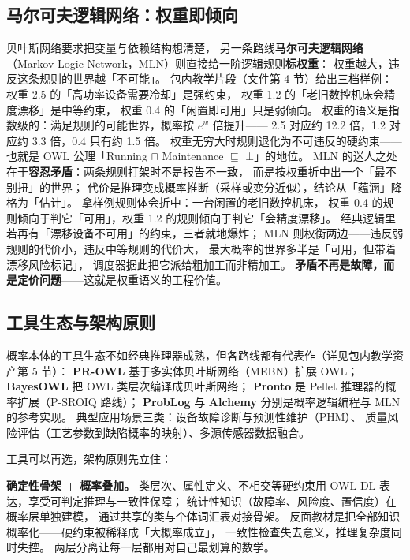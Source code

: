 \subsection{马尔可夫逻辑网络：权重即倾向}

贝叶斯网络要求把变量与依赖结构想清楚，
另一条路线\textbf{马尔可夫逻辑网络}（Markov Logic Network，MLN）则直接给一阶逻辑规则\textbf{标权重}：
权重越大，违反这条规则的世界越「不可能」。
包内教学片段（文件第 4 节）给出三档样例：
权重 2.5 的「高功率设备需要冷却」是强约束，
权重 1.2 的「老旧数控机床会精度漂移」是中等约束，
权重 0.4 的「闲置即可用」只是弱倾向。
权重的语义是指数级的：满足规则的可能世界，概率按 \(e^{w}\) 倍提升——
2.5 对应约 12.2 倍，1.2 对应约 3.3 倍，0.4 只有约 1.5 倍。
权重无穷大时规则退化为不可违反的硬约束——
也就是 OWL 公理「Running \(\sqcap\) Maintenance \(\sqsubseteq\) \(\bot\)」的地位。
MLN 的迷人之处在于\textbf{容忍矛盾}：两条规则打架时不是报告不一致，
而是按权重折中出一个「最不别扭」的世界；
代价是推理变成概率推断（采样或变分近似），结论从「蕴涵」降格为「估计」。
拿样例规则体会折中：一台闲置的老旧数控机床，
权重 0.4 的规则倾向于判它「可用」，权重 1.2 的规则倾向于判它「会精度漂移」。
经典逻辑里若再有「漂移设备不可用」的约束，三者就地爆炸；
MLN 则权衡两边——违反弱规则的代价小，违反中等规则的代价大，
最大概率的世界多半是「可用，但带着漂移风险标记」，
调度器据此把它派给粗加工而非精加工。
\textbf{矛盾不再是故障，而是定价问题}——这就是权重语义的工程价值。

\subsection{工具生态与架构原则}

概率本体的工具生态不如经典推理器成熟，但各路线都有代表作（详见包内教学资产第 5 节）：
\textbf{PR-OWL} 基于多实体贝叶斯网络（MEBN）扩展 OWL；
\textbf{BayesOWL} 把 OWL 类层次编译成贝叶斯网络；
\textbf{Pronto} 是 Pellet 推理器的概率扩展（P-SROIQ 路线）；
\textbf{ProbLog} 与 \textbf{Alchemy} 分别是概率逻辑编程与 MLN 的参考实现。
典型应用场景三类：设备故障诊断与预测性维护（PHM）、
质量风险评估（工艺参数到缺陷概率的映射）、多源传感器数据融合。

工具可以再选，架构原则先立住：

\begin{noteblock}
\textbf{确定性骨架 + 概率叠加。}
类层次、属性定义、不相交等硬约束用 OWL DL 表达，享受可判定推理与一致性保障；
统计性知识（故障率、风险度、置信度）在概率层单独建模，
通过共享的类与个体词汇表对接骨架。
反面教材是把全部知识概率化——硬约束被稀释成「大概率成立」，
一致性检查失去意义，推理复杂度同时失控。
两层分离让每一层都用对自己最划算的数学。
\end{noteblock}

